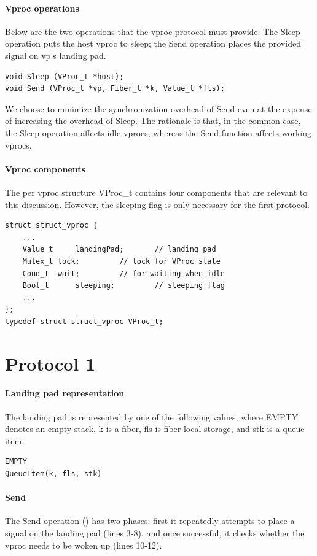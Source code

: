 \documentclass[11pt]{article}
\begin{document}
\paragraph{Vproc operations}
Below are the two operations that the vproc protocol must provide.
The Sleep operation puts the host vproc to sleep;
the Send operation places the provided signal on vp's landing pad.
\lstset{language=C}
\lstset{commentstyle=\textit}
\begin{lstlisting}
void Sleep (VProc_t *host);
void Send (VProc_t *vp, Fiber_t *k, Value_t *fls);
\end{lstlisting}
We choose to minimize the synchronization overhead of Send even at the expense of
increasing the overhead of Sleep.
The rationale is that, in the common case, the Sleep operation affects idle vprocs, whereas
the Send function affects working vprocs.

\paragraph{Vproc components}
The per vproc structure VProc\_t contains four components that are relevant to this discussion.
However, the sleeping flag is only necessary for the first protocol.
\lstset{language=C}
\lstset{commentstyle=\textit}
\begin{lstlisting}
struct struct_vproc {
    ...
    Value_t     landingPad;       // landing pad
    Mutex_t	lock;  		  // lock for VProc state
    Cond_t	wait;		  // for waiting when idle
    Bool_t      sleeping;         // sleeping flag
    ...
};
typedef struct struct_vproc VProc_t;
\end{lstlisting}

\section{Protocol 1}\label{sec:protocol1}

\paragraph{Landing pad representation}
The landing pad is represented by one of the following values, where EMPTY
denotes an empty stack, k is a fiber, fls is fiber-local storage, and stk
is a queue item.
\lstset{language=C}
\lstset{commentstyle=\textit}
\begin{lstlisting}
EMPTY
QueueItem(k, fls, stk)
\end{lstlisting}

\paragraph{Send}
The Send operation () has two phases: first it repeatedly attempts to place a
signal on the landing pad (lines 3-8), and once successful, it checks
whether the vproc needs to be woken up (lines 10-12).
\end{document}
